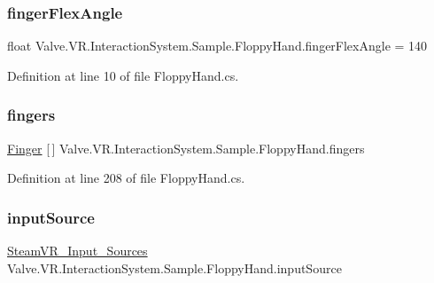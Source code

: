 \subsubsection{\texorpdfstring{fingerFlexAngle}{fingerFlexAngle}}
{\footnotesize\ttfamily float Valve.\+V\+R.\+Interaction\+System.\+Sample.\+Floppy\+Hand.\+finger\+Flex\+Angle = 140\hspace{0.3cm}{\ttfamily [protected]}}



Definition at line 10 of file Floppy\+Hand.\+cs.

\mbox{\label{class_valve_1_1_v_r_1_1_interaction_system_1_1_sample_1_1_floppy_hand_a3e38eee6e202a4553aa52e660ed43dc5}} 
\subsubsection{\texorpdfstring{fingers}{fingers}}
{\footnotesize\ttfamily \mbox{\hyperlink{class_valve_1_1_v_r_1_1_interaction_system_1_1_sample_1_1_floppy_hand_1_1_finger}{Finger}} \mbox{[}$\,$\mbox{]} Valve.\+V\+R.\+Interaction\+System.\+Sample.\+Floppy\+Hand.\+fingers}



Definition at line 208 of file Floppy\+Hand.\+cs.

\mbox{\label{class_valve_1_1_v_r_1_1_interaction_system_1_1_sample_1_1_floppy_hand_a72b3bab5c350ea43098ffb65d9b6db19}} 
\subsubsection{\texorpdfstring{inputSource}{inputSource}}
{\footnotesize\ttfamily \mbox{\hyperlink{namespace_valve_1_1_v_r_a82e5bf501cc3aa155444ee3f0662853f}{Steam\+V\+R\+\_\+\+Input\+\_\+\+Sources}} Valve.\+V\+R.\+Interaction\+System.\+Sample.\+Floppy\+Hand.\+input\+Source}




